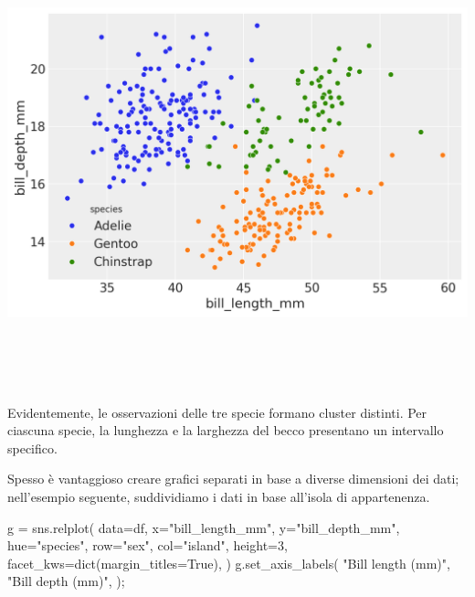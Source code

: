 \documentclass[
  letterpaper,
  krantz2]{{[}./krantz{]}}
\newenvironment{Shaded}{\begin{snugshade}}{\end{snugshade}}
\newcommand{\BuiltInTok}[1]{\textcolor[rgb]{0.00,0.23,0.31}{#1}}
\newcommand{\DecValTok}[1]{\textcolor[rgb]{0.68,0.00,0.00}{#1}}
\newcommand{\NormalTok}[1]{\textcolor[rgb]{0.00,0.23,0.31}{#1}}
\newcommand{\OperatorTok}[1]{\textcolor[rgb]{0.37,0.37,0.37}{#1}}
\newcommand{\StringTok}[1]{\textcolor[rgb]{0.13,0.47,0.30}{#1}}
\newcommand{\VariableTok}[1]{\textcolor[rgb]{0.07,0.07,0.07}{#1}}
\begin{document}
\includegraphics[width=7.61458in,height=5.11458in]{chapters/python/08_seaborn_files/figure-pdf/cell-11-output-1.png}

Evidentemente, le osservazioni delle tre specie formano cluster
distinti. Per ciascuna specie, la lunghezza e la larghezza del becco
presentano un intervallo specifico.

Spesso è vantaggioso creare grafici separati in base a diverse
dimensioni dei dati; nell'esempio seguente, suddividiamo i dati in base
all'isola di appartenenza.

\begin{Shaded}
\begin{Highlighting}[]
\NormalTok{g }\OperatorTok{=}\NormalTok{ sns.relplot(}
\NormalTok{    data}\OperatorTok{=}\NormalTok{df,}
\NormalTok{    x}\OperatorTok{=}\StringTok{"bill\_length\_mm"}\NormalTok{,}
\NormalTok{    y}\OperatorTok{=}\StringTok{"bill\_depth\_mm"}\NormalTok{,}
\NormalTok{    hue}\OperatorTok{=}\StringTok{"species"}\NormalTok{,}
\NormalTok{    row}\OperatorTok{=}\StringTok{"sex"}\NormalTok{,}
\NormalTok{    col}\OperatorTok{=}\StringTok{"island"}\NormalTok{,}
\NormalTok{    height}\OperatorTok{=}\DecValTok{3}\NormalTok{,}
\NormalTok{    facet\_kws}\OperatorTok{=}\BuiltInTok{dict}\NormalTok{(margin\_titles}\OperatorTok{=}\VariableTok{True}\NormalTok{),}
\NormalTok{)}
\NormalTok{g.set\_axis\_labels(}
    \StringTok{"Bill length (mm)"}\NormalTok{,}
    \StringTok{"Bill depth (mm)"}\NormalTok{,}
\NormalTok{)}\OperatorTok{;}
\end{Highlighting}
\end{Shaded}
\end{document}
